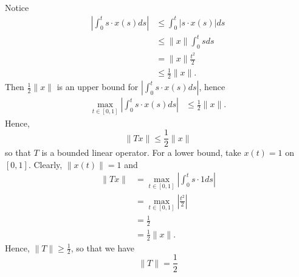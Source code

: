 \documentclass{article}
\begin{document}
\begin{itemize}
    Notice
    \begin{align*}
        \left|\int_0^t s \cdot x(s)ds\right| &\leq \int_0^t |s \cdot x(s)| ds\\
        &\leq \|x\| \int_0^t s ds\\
        &= \|x\| \frac{t^2}{2}\\
        &\leq \frac{1}{2}\|x\|.
    \end{align*}
    Then $\frac{1}{2}\|x\|$ is an upper bound for $|\int_0^t s\cdot x(s)ds|$, hence
    \begin{align*}
        \max_{t \in [0,1]} \left|\int_0^t s \cdot x(s)ds\right| &\leq \frac{1}{2}\|x\|.
    \end{align*}
    Hence,
    \[\|Tx\| \leq \frac{1}{2}\|x\|\]
     so that $T$ is a bounded linear operator. For a lower bound, take $x(t) = 1$ on $[0,1]$. Clearly, $\|x(t)\| = 1$ and 
     \begin{align*}
        \|Tx\| &= \max_{t \in [0,1]}\left|\int_0^t s \cdot 1ds\right|\\
        &= \max_{t \in [0,1]} \left|\frac{t^2}{2}\right|\\
        &= \frac{1}{2}\\
        &= \frac{1}{2}\|x\|.
     \end{align*}
     Hence, $\|T\| \geq \frac{1}{2}$, so that we have
     \[\|T\| = \frac{1}{2}\]
    



\end{itemize}
\end{document}
